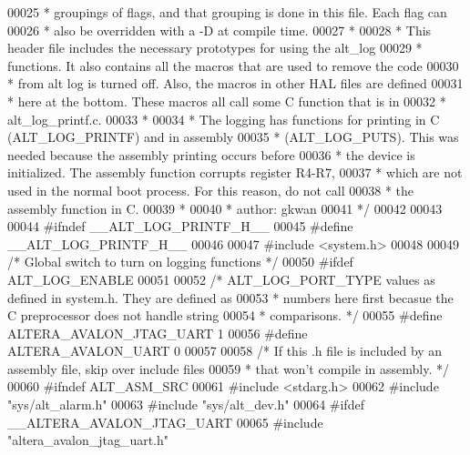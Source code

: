 \begin{DoxyCode}
00025 \textcolor{comment}{ *  groupings of flags, and that grouping is done in this file.  Each flag can }
00026 \textcolor{comment}{ *  also be overridden with a -D at compile time.}
00027 \textcolor{comment}{ *}
00028 \textcolor{comment}{ *  This header file includes the necessary prototypes for using the alt\_log}
00029 \textcolor{comment}{ *  functions.  It also contains all the macros that are used to remove the code}
00030 \textcolor{comment}{ *  from alt log is turned off.  Also, the macros in other HAL files are defined }
00031 \textcolor{comment}{ *  here at the bottom.  These macros all call some C function that is in }
00032 \textcolor{comment}{ *  alt\_log\_printf.c.}
00033 \textcolor{comment}{ *}
00034 \textcolor{comment}{ *  The logging has functions for printing in C (ALT\_LOG\_PRINTF) and in assembly}
00035 \textcolor{comment}{ *  (ALT\_LOG\_PUTS).  This was needed because the assembly printing occurs before}
00036 \textcolor{comment}{ *  the device is initialized.  The assembly function corrupts register R4-R7, }
00037 \textcolor{comment}{ *  which are not used in the normal boot process.  For this reason, do not call}
00038 \textcolor{comment}{ *  the assembly function in C.}
00039 \textcolor{comment}{ *}
00040 \textcolor{comment}{ *  author: gkwan }
00041 \textcolor{comment}{ */}
00042 
00043 
00044 \textcolor{preprocessor}{#ifndef \_\_ALT\_LOG\_PRINTF\_H\_\_}
00045 \textcolor{preprocessor}{#define \_\_ALT\_LOG\_PRINTF\_H\_\_}
00046 
00047 \textcolor{preprocessor}{#include <system.h>}
00048 
00049 \textcolor{comment}{/* Global switch to turn on logging functions */}
00050 \textcolor{preprocessor}{#ifdef ALT\_LOG\_ENABLE}
00051 
00052     \textcolor{comment}{/* ALT\_LOG\_PORT\_TYPE values as defined in system.h.  They are defined as}
00053 \textcolor{comment}{     * numbers here first becasue the C preprocessor does not handle string}
00054 \textcolor{comment}{     * comparisons.  */}
00055 \textcolor{preprocessor}{    #define ALTERA\_AVALON\_JTAG\_UART 1}
00056 \textcolor{preprocessor}{    #define ALTERA\_AVALON\_UART 0}
00057 
00058     \textcolor{comment}{/* If this .h file is included by an assembly file, skip over include files}
00059 \textcolor{comment}{     * that won't compile in assembly. */}
00060 \textcolor{preprocessor}{    #ifndef ALT\_ASM\_SRC}
00061 \textcolor{preprocessor}{        #include <stdarg.h>}
00062 \textcolor{preprocessor}{        #include "sys/alt_alarm.h"}
00063 \textcolor{preprocessor}{        #include "sys/alt_dev.h"}
00064 \textcolor{preprocessor}{        #ifdef \_\_ALTERA\_AVALON\_JTAG\_UART }
00065 \textcolor{preprocessor}{            #include "altera\_avalon\_jtag\_uart.h"}

\end{DoxyCode}
